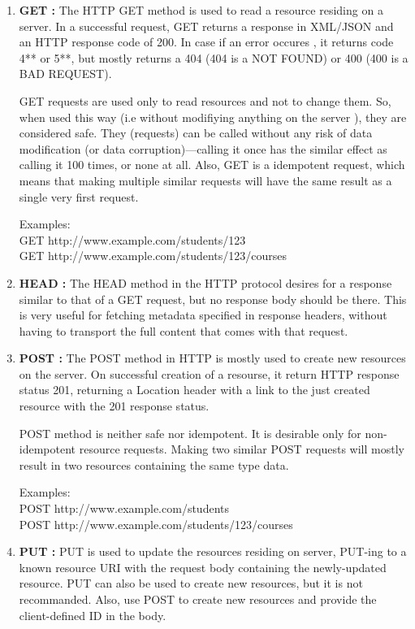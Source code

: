 \begin{enumerate}
\item \textbf{GET : } The HTTP GET method is used to read a resource residing on a server. In a successful request, GET returns a response in XML/JSON and an HTTP response code of 200. In case if an error occures , it returns code 4** or 5**, but mostly returns a 404 (404 is a NOT FOUND) or 400 (400 is a BAD REQUEST).

\hspace*{0.2in}GET requests are used only to read resources and not to change them. So, when used this way (i.e without modifiying anything on the server ), they are considered safe. They (requests) can be called without any risk of data modification (or data corruption)—calling it once has the similar effect as calling it 100 times, or none at all. Also, GET is a idempotent request, which means that making multiple similar requests will have the same result as a single very first  request.

Examples:\\
GET http://www.example.com/students/123\\
GET http://www.example.com/students/123/courses\\

\item \textbf{HEAD : } The HEAD method in the HTTP protocol desires for a response similar to that of a GET request, but no response body should be there. This is  very useful for fetching metadata specified in response headers, without having to transport the full content that comes with that request.

\item \textbf{POST : } The POST method in HTTP is mostly used to create new resources on the server. On successful creation of a resourse, it return HTTP response status 201, returning a Location header with a link to the just created resource with the 201 response status.

POST method is neither safe nor idempotent. It is desirable only for non-idempotent resource requests. Making two similar POST requests will mostly result in two resources containing the same type data.

Examples:\\
POST http://www.example.com/students\\
POST http://www.example.com/students/123/courses\\

\item \textbf{PUT : } PUT is used to update the resources residing on server, PUT-ing to a known resource URI with the request body containing the newly-updated resource. PUT can also be used to create new resources, but it is not recommanded. Also, use POST to create new resources and provide the client-defined ID in the body.


\end{enumerate}
